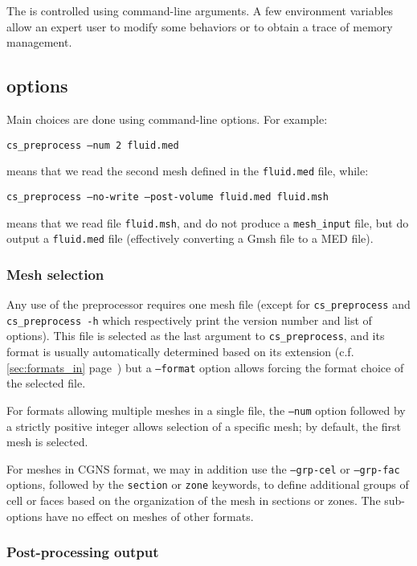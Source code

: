 {{{The \pcs is controlled using command-line arguments.
A few environment variables allow an expert user to modify
some behaviors or to obtain a trace of memory management.

\subsection{\pcs options\label{sec:optpcs}}

Main choices are done using command-line options. For example:

\texttt{cs\_preprocess --num 2 fluid.med}

\noindent means that we read the second mesh defined in the
\texttt{fluid.med} file, while:

\texttt{cs\_preprocess --no-write --post-volume fluid.med fluid.msh}

\noindent means that we read file \texttt{fluid.msh}, and
do not produce a \texttt{mesh\_input}  file, but do output
a \texttt{fluid.med} file (effectively converting a Gmsh file to
a MED file).

\subsubsection{Mesh selection\label{sec:optpcs:mesh}}

Any use of the preprocessor requires one mesh file (except for
\texttt{cs\_preprocess} and \texttt{cs\_preprocess~-h} which respectively
print the version number and list of options).
This file is selected as the last argument to \texttt{cs\_preprocess},
and its format is usually automatically determined based on its
extension (c.f. \ref{sec:formats_in} page~\pageref{sec:formats_in})
but a \texttt{--format} option allows forcing the format choice of
the selected file.

For formats allowing multiple meshes in a single file, the
\texttt{--num} option followed by a strictly positive integer allows
selection of a specific mesh; by default, the first mesh is selected.

For meshes in CGNS format, we may in addition use the \texttt{--grp-cel}
or \texttt{--grp-fac} options, followed by the \texttt{section}
or \texttt{zone} keywords, to define additional groups of cell or faces
based on the organization of the mesh in sections or zones. The sub-options
have no effect on meshes of other formats.

\subsubsection{Post-processing output\label{sec:optpcs:post}}

}}}

